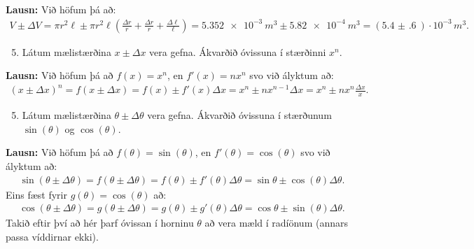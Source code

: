 \ifdefined \wholebook \else\documentclass[oneside]{book}\usepackage{EdlBook}\graphicspath{{figures/}}
\begin{document}
\textbf{Lausn:} Við höfum þá að:
\begin{align*}
    V \pm \Delta V = \pi r^2 \ell \pm  \pi r^2 \ell \left( \frac{\Delta r}{r} + \frac{\Delta r}{r} + \frac{\Delta \ell }{\ell} \right) = \SI{5.352e-3}{m^3} \pm \SI{5.82e-4}{m^3} = (\SI{5.4(6)}{})\cdot 10^{-3} \, \si{m^3}.
\end{align*}


\begin{enumerate}[label = \textbf{Sýnidæmi \thechapter.\arabic*.}]

\setcounter{enumi}{4}

\item Látum mælistærðina $x \pm \Delta x$ vera gefna. Ákvarðið óvissuna í stærðinni $x^n$.

\end{enumerate}

\textbf{Lausn:} Við höfum þá að $f(x) = x^n$, en $f'(x) = n x^n$ svo við ályktum að:
\begin{align*}
    (x \pm \Delta x)^n = f(x \pm \Delta x) = f(x) \pm f'(x) \Delta x =  x^n \pm n x^{n-1} \Delta x =x^n \pm n x^n \frac{\Delta x}{x}.
\end{align*}

\begin{enumerate}[label = \textbf{Sýnidæmi \thechapter.\arabic*.}]

\setcounter{enumi}{4}

\item Látum mælistærðina $\theta \pm \Delta \theta$ vera gefna. Ákvarðið óvissuna í stærðunum $\sin(\theta)$ og $\cos(\theta)$.

\end{enumerate}

\textbf{Lausn:} Við höfum þá að $f(\theta) = \sin(\theta)$, en $f'(\theta) = \cos(\theta)$ svo við ályktum að:
\begin{align*}
    \sin(\theta \pm \Delta \theta) = f(\theta \pm \Delta \theta) = f(\theta) \pm f'(\theta) \Delta \theta =  \sin\theta \pm \cos(\theta)\Delta \theta.
\end{align*}
Eins fæst fyrir $g(\theta) =\cos(\theta)$ að:
\begin{align*}
    \cos(\theta \pm \Delta \theta) = g(\theta \pm \Delta \theta) = g(\theta) \pm g'(\theta) \Delta \theta =  \cos\theta \pm \sin(\theta)\Delta \theta.
\end{align*}
Takið eftir því að hér þarf óvissan í horninu $\theta$ að vera mæld í radíönum (annars passa víddirnar ekki).
\newpage
\end{document}
